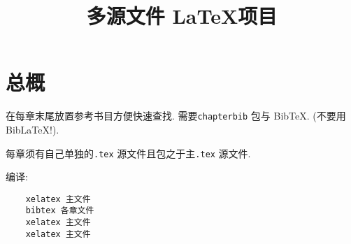 \documentclass[11pt,oneside]{ctexbook}
\title{多源文件 \LaTeX 项目 }
\begin{document}
\frontmatter

\chapter*{总概}

在每章末尾放置参考书目方便快速查找. 需要\texttt{chapterbib} 包与 BibTeX. (不要用 BibLaTeX!).

每章须有自己单独的\texttt{.tex} 源文件且包之于主\texttt{.tex} 源文件.

编译:
\begin{verbatim}
    xelatex 主文件
    bibtex 各章文件
    xelatex 主文件
    xelatex 主文件
\end{verbatim}

\tableofcontents

\mainmatter



\backmatter

\end{document}
